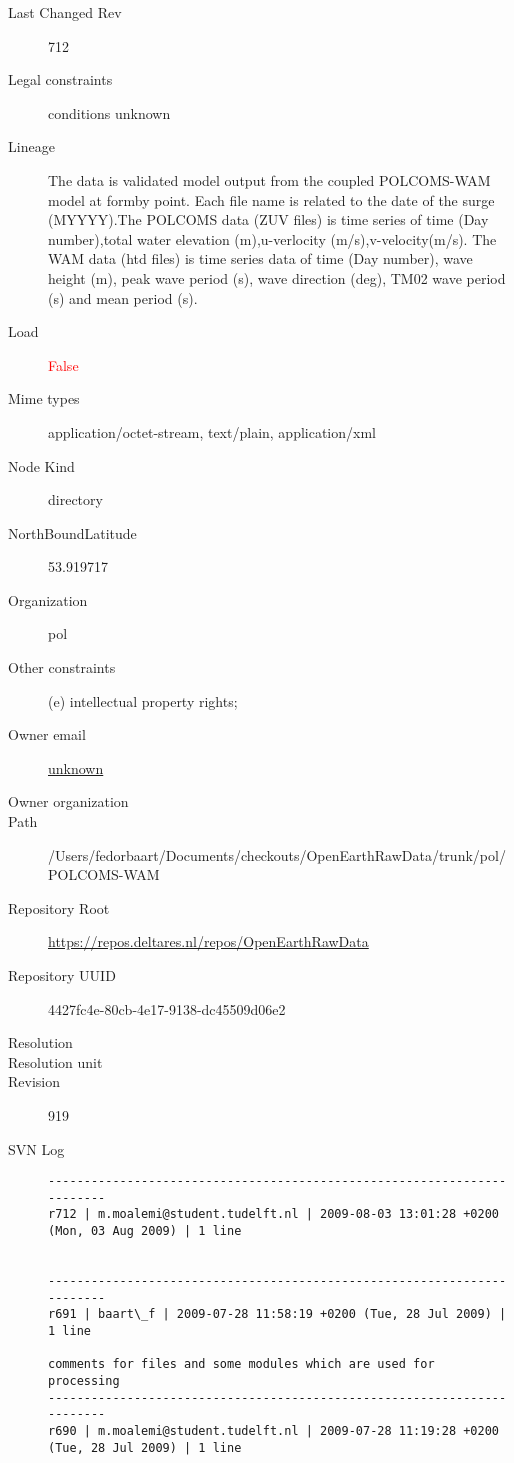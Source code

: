 \documentclass[9]{report}
\begin{document}
\begin{description}
  \item[Last Changed Rev] 712
  \item[Legal constraints] conditions unknown
  \item[Lineage] The data is validated model output from the coupled POLCOMS-WAM model at formby point. Each file name is related to the date of the surge (MYYYY).The POLCOMS data (ZUV files) is time series of time (Day number),total water elevation (m),u-verlocity (m/s),v-velocity(m/s). The WAM data (htd files) is time series data of time (Day number), wave height (m), peak wave period (s), wave direction (deg), TM02 wave period (s) and mean period (s).
  \item[Load] \textcolor{red}{False}
  \item[Mime types] application/octet-stream, text/plain, application/xml
  \item[Node Kind] directory
  \item[NorthBoundLatitude] 53.919717
  \item[Organization] pol
  \item[Other constraints] (e) intellectual property rights;
  \item[Owner email] \href{mailto:unknown}{unknown}
  \item[Owner organization] 
  \item[Path] /Users/fedorbaart/Documents/checkouts/OpenEarthRawData/trunk/pol/POLCOMS-WAM
  \item[Repository Root] \href{https://repos.deltares.nl/repos/OpenEarthRawData}{https://repos.deltares.nl/repos/OpenEarthRawData}
  \item[Repository UUID] 4427fc4e-80cb-4e17-9138-dc45509d06e2
  \item[Resolution] 
  \item[Resolution unit] 
  \item[Revision] 919
  \item[SVN Log] \begin{verbatim}
------------------------------------------------------------------------
r712 | m.moalemi@student.tudelft.nl | 2009-08-03 13:01:28 +0200 (Mon, 03 Aug 2009) | 1 line


------------------------------------------------------------------------
r691 | baart\_f | 2009-07-28 11:58:19 +0200 (Tue, 28 Jul 2009) | 1 line

comments for files and some modules which are used for processing
------------------------------------------------------------------------
r690 | m.moalemi@student.tudelft.nl | 2009-07-28 11:19:28 +0200 (Tue, 28 Jul 2009) | 1 line



\end{verbatim}
\end{description}
\end{document}
